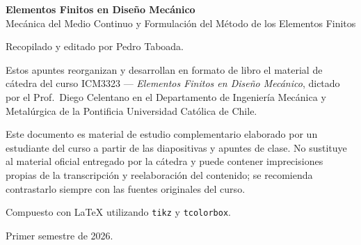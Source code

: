 \thispagestyle{empty}
\vspace*{4cm}

\begin{center}
\textbf{Elementos Finitos en Diseño Mecánico}\\
Mecánica del Medio Continuo y Formulación del Método de los Elementos Finitos
\end{center}

\vspace{1.5cm}

\noindent Recopilado y editado por Pedro Taboada.

\vspace{0.4cm}
\noindent Estos apuntes reorganizan y desarrollan en formato de libro el material de cátedra del curso ICM3323 --- \emph{Elementos Finitos en Diseño Mecánico}, dictado por el Prof.\ Diego Celentano en el Departamento de Ingeniería Mecánica y Metalúrgica de la Pontificia Universidad Católica de Chile.

\vspace{0.4cm}
\noindent Este documento es material de estudio complementario elaborado por un estudiante del curso a partir de las diapositivas y apuntes de clase. No sustituye al material oficial entregado por la cátedra y puede contener imprecisiones propias de la transcripción y reelaboración del contenido; se recomienda contrastarlo siempre con las fuentes originales del curso.

\vspace{0.4cm}
\noindent Compuesto con \LaTeX{} utilizando \texttt{tikz} y \texttt{tcolorbox}.

\vspace{0.4cm}
\noindent Primer semestre de 2026.
